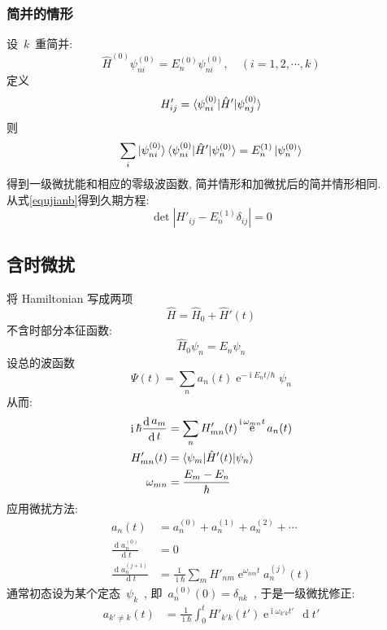 \documentclass[11pt,a4paper,twocolumn,fleqn]{article}%
\DeclareMathOperator{\dif}{d}
\DeclareMathOperator{\diff}{\, d}
\DeclareMathOperator{\mi}{i}
\DeclareMathOperator{\e}{e}%
\renewcommand{\[}{~$}
\renewcommand{\]}{$~}%
\begin{document}
	\subsubsection{简并的情形}
	设\[k\]重简并:
	\begin{equation}
	 \hat H^{(0)}\psi_{ni}^{(0)} = E_n^{(0)}\psi_{ni}^{(0)}, \quad (i=1,2,\cdots,k)
	\end{equation}
	定义
	\begin{equation}
	 H'_{ij} = \braket{\psi_{ni}^{(0)}|\hat H'|\psi_{nj}^{(0)}}
	\end{equation}
	则
	\begin{equation}\label{equjianb}
	 \sum_i\ket{\psi_{ni}^{(0)}}\braket{\psi_{ni}^{(0)}|\hat H'|\psi_n^{(0)}} = E_n^{(1)}\ket{\psi_n^{(0)}}
	\end{equation}
	得到一级微扰能和相应的零级波函数, 简并情形和加微扰后的简并情形相同. \\
	从式\ref{equjianb}得到久期方程:
	\begin{equation}
	 \det\left|H'_{ij} - E_n^{(1)}\delta_{ij}\right|=0
	\end{equation}
	\subsection{含时微扰}
	将 Hamiltonian 写成两项
	\begin{equation}
	 \hat H = \hat H_0 + \hat H'(t)
	\end{equation}
	不含时部分本征函数:
	\begin{equation}
	 \hat H_0\psi_n = E_n\psi_n
	\end{equation}
	设总的波函数
	\begin{equation}
	 \Psi(t) = \sum_n a_n(t)\e^{-\mi E_n t/\hbar}\psi_n
	\end{equation}
	从而:
	\begin{align}
	 \mi\hbar\frac{\dif a_m}{\dif t} &= \sum_n H'_{mn}(t)\e^{\mi\omega_{mn}t}a_n(t) \\
	 H'_{mn}(t) &= \braket{\psi_m|\hat H'(t)|\psi_n} \\
	 \omega_{mn} &= \frac{E_m - E_n}{\hbar}
	\end{align}
	应用微扰方法:
	\begin{align}
	 a_n(t) &= a_n^{(0)} + a_n^{(1)} + a_n^{(2)} + \cdots \\
	 \frac{\dif a_n^{(0)}}{\dif t} &= 0 \\
	 \frac{\dif a_n^{(j+1)}}{\dif t} &= \frac{1}{\mi\hbar}\sum_m H'_{nm}\e^{\omega_{nm}t}a^{(j)}_n(t)
	\end{align}
	通常初态设为某个定态\[\psi_k\], 即\[a_n^{(0)}(0) = \delta_{nk}\],
	于是一级微扰修正:
	\begin{align}
	 a_{k'\neq k}(t) &= \frac{1}{\mi\hbar}\int_0^t H'_{k'k}(t')\e^{\mi\omega_{k'k}t'}\diff t'
	\end{align}
 
\end{document}
